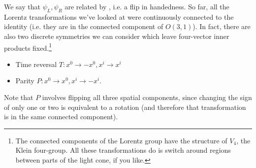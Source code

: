 We say that $\psi_L,\psi_R$ are related by , i.e. a flip in handedness. So far, all the Lorentz transformations we've looked at were continuously connected to the identity (i.e. they are in the connected component of $O(3,1)$). In fact, there are also two discrete symmetries we can consider which leave four-vector inner products fixed.\footnote{The connected components of the Lorentz group have the structure of $V_4$, the Klein four-group. All these transformations do is switch around regions between parts of the light cone, if you like.}
\begin{itemize}
    \item Time reversal $T: x^0\to -x^0, x^i \to x^i$
    \item Parity $P: x^0\to x^0, x^i\to -x^i$.
\end{itemize}
Note that $P$ involves flipping all three spatial components, since changing the sign of only one or two is equivalent to a rotation (and therefore that transformation is in the same connected component).

